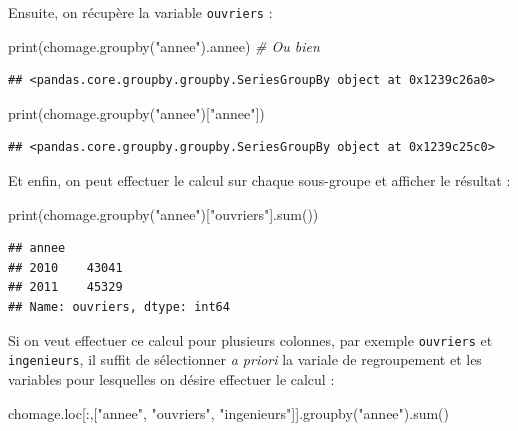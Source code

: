 \documentclass[12pt,]{book}
\newenvironment{Shaded}{\begin{snugshade}}{\end{snugshade}}
\newcommand{\StringTok}[1]{\textcolor[rgb]{0.31,0.60,0.02}{#1}}
\newcommand{\CommentTok}[1]{\textcolor[rgb]{0.56,0.35,0.01}{\textit{#1}}}
\newcommand{\BuiltInTok}[1]{#1}
\newcommand{\NormalTok}[1]{#1}
\numberwithin{equation}{section}
\numberwithin{countremarque}{section}
\begin{document}
Ensuite, on récupère la variable \texttt{ouvriers} :

\begin{Shaded}
\begin{Highlighting}[]
\BuiltInTok{print}\NormalTok{(chomage.groupby(}\StringTok{"annee"}\NormalTok{).annee)}
\CommentTok{# Ou bien}
\end{Highlighting}
\end{Shaded}

\begin{lstlisting}
## <pandas.core.groupby.groupby.SeriesGroupBy object at 0x1239c26a0>
\end{lstlisting}

\begin{Shaded}
\begin{Highlighting}[]
\BuiltInTok{print}\NormalTok{(chomage.groupby(}\StringTok{"annee"}\NormalTok{)[}\StringTok{"annee"}\NormalTok{])}
\end{Highlighting}
\end{Shaded}

\begin{lstlisting}
## <pandas.core.groupby.groupby.SeriesGroupBy object at 0x1239c25c0>
\end{lstlisting}

Et enfin, on peut effectuer le calcul sur chaque sous-groupe et afficher
le résultat :

\begin{Shaded}
\begin{Highlighting}[]
\BuiltInTok{print}\NormalTok{(chomage.groupby(}\StringTok{"annee"}\NormalTok{)[}\StringTok{"ouvriers"}\NormalTok{].}\BuiltInTok{sum}\NormalTok{())}
\end{Highlighting}
\end{Shaded}

\begin{lstlisting}
## annee
## 2010    43041
## 2011    45329
## Name: ouvriers, dtype: int64
\end{lstlisting}

Si on veut effectuer ce calcul pour plusieurs colonnes, par exemple
\texttt{ouvriers} et \texttt{ingenieurs}, il suffit de sélectionner
\emph{a priori} la variale de regroupement et les variables pour
lesquelles on désire effectuer le calcul :

\begin{Shaded}
\begin{Highlighting}[]
\NormalTok{chomage.loc[:,[}\StringTok{"annee"}\NormalTok{, }\StringTok{"ouvriers"}\NormalTok{, }\StringTok{"ingenieurs"}\NormalTok{]].groupby(}\StringTok{"annee"}\NormalTok{).}\BuiltInTok{sum}\NormalTok{()}
\end{Highlighting}
\end{Shaded}
\end{document}
